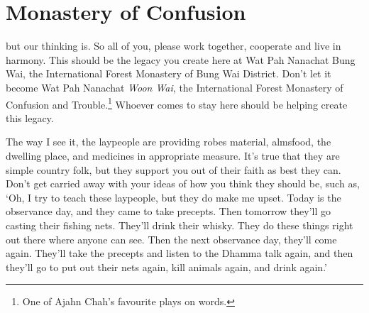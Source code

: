 
\renewcommand{\chapterFootnotemark}{\footnotemark}
\renewcommand{\chapterFootnotetext}{\footnotetext{\textit{Note}: This talk has been published elsewhere under the title: `\textit{Free From Doubt}'}}

\chapter{Monastery of Confusion}

\vspace*{\baselineskip}
 but our thinking is. So all of you, please work together, cooperate and live in harmony. This should be the legacy you create here at Wat Pah Nanachat Bung Wai, the International Forest Monastery of Bung Wai District. Don't let it become Wat Pah Nanachat \textit{Woon Wai}, the International Forest Monastery of Confusion and Trouble.\footnote{One of Ajahn Chah's favourite plays on words.} Whoever comes to stay here should be helping create this legacy. 

The way I see it, the laypeople are providing robes material, almsfood, the dwelling place, and medicines in appropriate measure. It's true that they are simple country folk, but they support you out of their faith as best they can. Don't get carried away with your ideas of how you think they should be, such as, `Oh, I try to teach these laypeople, but they do make me upset. Today is the observance day, and they came to take precepts. Then tomorrow they'll go casting their fishing nets. They'll drink their whisky. They do these things right out there where anyone can see. Then the next observance day, they'll come again. They'll take the precepts and listen to the Dhamma talk again, and then they'll go to put out their nets again, kill animals again, and drink again.'

